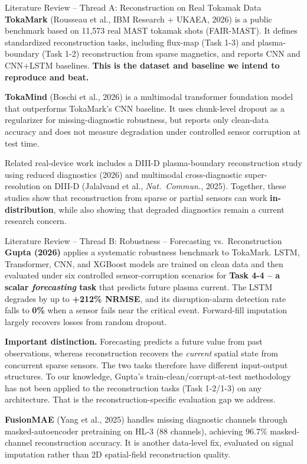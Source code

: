 \documentclass[aspectratio=169]{beamer}
\begin{document}
\begin{frame}{Literature Review -- Thread A: Reconstruction on Real Tokamak Data}
  \small
  \textbf{TokaMark} (Rousseau et al., IBM Research + UKAEA, 2026) is a
  public benchmark based on 11{,}573 real MAST tokamak shots (FAIR-MAST).
  It defines standardized reconstruction tasks, including flux-map
  (Task 1-3) and plasma-boundary (Task 1-2) reconstruction from sparse
  magnetics, and reports CNN and CNN+LSTM baselines. \textbf{This is the
  dataset and baseline we intend to reproduce and beat.}

  \vspace{4pt}
  \textbf{TokaMind} (Boschi et al., 2026) is a multimodal transformer
  foundation model that outperforms TokaMark's CNN baseline. It uses
  chunk-level dropout as a regularizer for missing-diagnostic robustness,
  but reports only clean-data accuracy and does not measure degradation under
  controlled sensor corruption at test time.

  \vspace{4pt}
  Related real-device work includes a DIII-D plasma-boundary reconstruction
  study using reduced diagnostics (2026) and multimodal cross-diagnostic
  super-resolution on DIII-D (Jalalvand et al., \textit{Nat.\ Commun.},
  2025). Together, these studies show that reconstruction from sparse or
  partial sensors can work \textbf{in-distribution}, while also showing that
  degraded diagnostics remain a current research concern.
\end{frame}

\begin{frame}{Literature Review -- Thread B: Robustness -- Forecasting vs.\ Reconstruction}
  \small
  \textbf{Gupta (2026)} applies a systematic robustness benchmark to
  TokaMark. LSTM, Transformer, CNN, and XGBoost models are trained on
  clean data and then evaluated under six controlled sensor-corruption
  scenarios for \textbf{Task 4-4 -- a scalar \emph{forecasting} task} that
  predicts future plasma current. The LSTM degrades by up to
  \textbf{+212\% NRMSE}, and its disruption-alarm detection rate falls to
  \textbf{0\%} when a sensor fails near the critical event. Forward-fill
  imputation largely recovers losses from random dropout.

  \vspace{6pt}
  \textbf{Important distinction.} Forecasting predicts a future value from
  past observations, whereas reconstruction recovers the \emph{current}
  spatial state from concurrent sparse sensors. The two tasks therefore have
  different input-output structures. To our knowledge, Gupta's
  train-clean/corrupt-at-test methodology has not been applied to the
  reconstruction tasks (Task 1-2/1-3) on any architecture. That is the
  reconstruction-specific evaluation gap we address.

  \vspace{6pt}
  \textbf{FusionMAE} (Yang et al., 2025) handles missing diagnostic channels
  through masked-autoencoder pretraining on HL-3 (88 channels), achieving
  96.7\% masked-channel reconstruction accuracy. It is another data-level
  fix, evaluated on signal imputation rather than 2D spatial-field
  reconstruction quality.
\end{frame}
\end{document}

